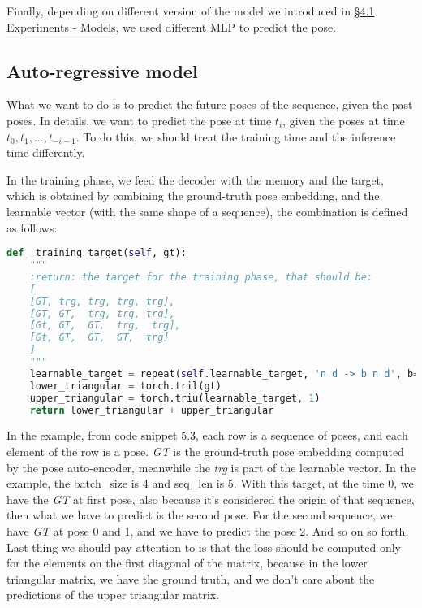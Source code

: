 Finally, depending on different version of the model we introduced in \hyperref[subsec:models]{\S4.1 Experiments - Models}, we used different MLP to predict the pose.

\subsection{Auto-regressive model}\label{subsec:auto-regressive-model}
What we want to do is to predict the future poses of the sequence, given the past poses.
In details, we want to predict the pose at time $t_i$, given the poses at time $t_0, t_1, \dots, t_{-i-1}$.
To do this, we should treat the training time and the inference time differently.

In the training phase, we feed the decoder with the memory and the target, which is obtained by combining the ground-truth pose embedding, and the learnable vector (with the same shape of a sequence), the combination is defined as follows:
\begin{lstlisting}[captionpos=b, label={lst:lst-training-target}, caption={Training target}, language=Python]
def _training_target(self, gt):
    """
    :return: the target for the training phase, that should be:
    [
    [GT, trg, trg, trg, trg],
    [GT, GT,  trg, trg, trg],
    [Gt, GT,  GT,  trg,  trg],
    [Gt, GT,  GT,  GT,  trg]
    ]
    """
    learnable_target = repeat(self.learnable_target, 'n d -> b n d', b=gt.shape[0])
    lower_triangular = torch.tril(gt)
    upper_triangular = torch.triu(learnable_target, 1)
    return lower_triangular + upper_triangular
\end{lstlisting}
In the example, from code snippet 5.3, each row is a sequence of poses, and each element of the row is a pose.
\textit{GT} is the ground-truth pose embedding computed by the pose auto-encoder, meanwhile the \textit{trg} is part of the learnable vector.
In the example, the batch\_size is 4 and seq\_len is 5.
With this target, at the time 0, we have the \textit{GT} at first pose, also because it's considered the origin of that sequence, then what we have to predict is the second pose.
For the second sequence, we have \textit{GT} at pose 0 and 1, and we have to predict the pose 2.
And so on so forth.
Last thing we should pay attention to is that the loss should be computed only for the elements on the first diagonal of the matrix, because in the lower triangular matrix, we have the ground truth, and we don't care about the predictions of the upper triangular matrix.

